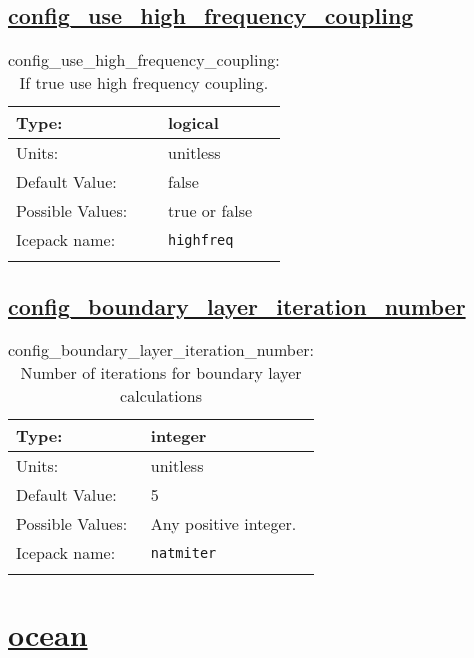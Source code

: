 \subsection[config\_use\_high\_frequency\_coupling]{\hyperref[sec:nm_tab_atmosphere]{config\_use\_high\_frequency\_coupling}}
\label{subsec:nm_sec_config_use_high_frequency_coupling}
\begin{center}
\begin{longtable}{| p{2.0in} || p{4.0in} |}
    \hline
    Type: & logical \\
    \hline
    Units: & \si{unitless} \\
    \hline
    Default Value: & false \\
    \hline
    Possible Values: & true or false \\
    \hline
    \hline
    Icepack name: & \verb+highfreq+ \\
    \caption{config\_use\_high\_frequency\_coupling: If true use high frequency coupling.}
\end{longtable}
\end{center}
\subsection[config\_boundary\_layer\_iteration\_number]{\hyperref[sec:nm_tab_atmosphere]{config\_boundary\_layer\_iteration\_number}}
\label{subsec:nm_sec_config_boundary_layer_iteration_number}
\begin{center}
\begin{longtable}{| p{2.0in} || p{4.0in} |}
    \hline
    Type: & integer \\
    \hline
    Units: & \si{unitless} \\
    \hline
    Default Value: & 5 \\
    \hline
    Possible Values: & Any positive integer. \\
    \hline
    \hline
    Icepack name: & \verb+natmiter+ \\
    \caption{config\_boundary\_layer\_iteration\_number: Number of iterations for boundary layer calculations}
\end{longtable}
\end{center}
\section[ocean]{\hyperref[sec:nm_tab_ocean]{ocean}}
\label{sec:nm_sec_ocean}
